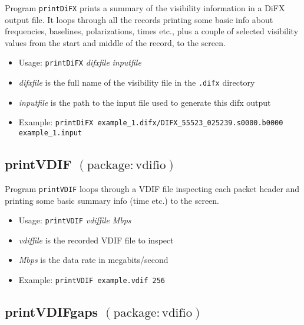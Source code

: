 Program {\tt printDiFX} prints a summary of the visibility information in a DiFX output file.
It loops through all the records printing some basic info about frequencies, baselines, polarizations, times etc., plus a couple of selected visibility values from the start and middle of the record, to the screen.

\begin{itemize}
\item[] Usage: {\tt printDiFX} {\em difxfile} {\em inputfile}

\item[] {\em difxfile} is the full name of the visibility file in the {\tt .difx} directory
\item[] {\em inputfile} is the path to the input file used to generate this difx output
\end{itemize}
\begin{itemize}
\item[] Example: {\tt printDiFX example\_1.difx/DIFX\_55523\_025239.s0000.b0000 example\_1.input}
\end{itemize}





\subsection{printVDIF {\small $\mathrm{(package: vdifio)}$} \label{sec:printVDIF}}

Program {\tt printVDIF} loops through a VDIF file inspecting each packet header and printing some basic summary info (time etc.) to the screen.

\begin{itemize}
\item[] Usage: {\tt printVDIF} {\em vdiffile} {\em Mbps}

\item[] {\em vdiffile} is the recorded VDIF file to inspect
\item[] {\em Mbps} is the data rate in megabits/second

\item[] Example: {\tt printVDIF example.vdif 256}
\end{itemize}




\subsection{printVDIFgaps {\small $\mathrm{(package: vdifio)}$}} \label{sec:printVDIFgaps}



